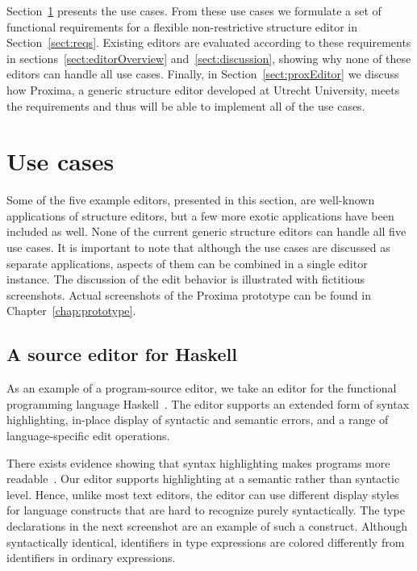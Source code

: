 \documentclass{entcs}
\begin{document}
Section~\ref{sect:usecases} presents the use cases. From these use cases we formulate a set of functional requirements for a flexible non-restrictive structure editor in Section~\ref{sect:reqs}. Existing editors are evaluated according to these requirements in sections~\ref{sect:editorOverview} and~\ref{sect:discussion}, showing why none of these editors can handle all use cases. Finally, in Section~\ref{sect:proxEditor} we discuss how Proxima, a generic structure editor developed at Utrecht University, meets the requirements and thus will be able to implement all of the use cases.

\section{Use cases} \label{sect:usecases}


Some of the five example editors, presented in this section, are well-known applications of structure editors, but a few more exotic applications have been included as well. None of the current generic structure editors can handle all five use cases. It is important to note that although the use cases are discussed as separate applications, aspects of them can be combined in a single editor instance.
The discussion of the edit behavior is illustrated with fictitious screenshots. Actual screenshots of the Proxima prototype can be found in Chapter~\ref{chap:prototype}.



%								
\subsection{A source editor for Haskell}  \label{sect:sourceeditor} 

As an example of a program-source editor, we take an editor for the functional programming language Haskell~\cite{peytonJones03haskell}. The editor supports an extended form of syntax highlighting, in-place display of syntactic and semantic errors, and a range of language-specific edit operations. 

There exists evidence showing that syntax highlighting makes programs more readable~\cite{baecker88readability,omanCook90typography}. Our editor supports highlighting at a semantic rather than syntactic level. Hence, unlike most text editors, the editor can use different display styles for language constructs that are hard to recognize purely syntactically. The type declarations in the next screenshot are an example of such a construct. Although syntactically identical, identifiers in type expressions are colored differently from identifiers in ordinary expressions.
\end{document}
